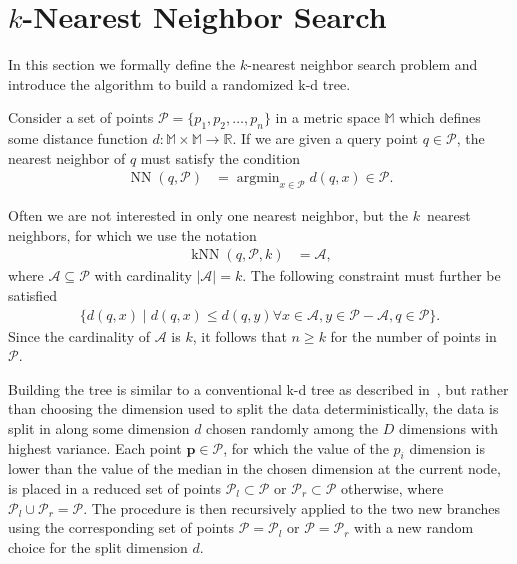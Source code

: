 \section{$k$-Nearest Neighbor Search}
  \label{sec:background}

  In this section we formally define the $k$-nearest neighbor search problem 
  and introduce the algorithm to build a randomized k-d tree.

   Consider a set of points $\mathcal{P} 
  = \{p_1,p_2,\dots,p_n\}$ in a metric space $\mathbb{M}$ which defines some 
  distance function $d\colon\mathbb{M}\times\mathbb{M}\to\mathbb{R}$.  If we 
  are given a query point $q\in\mathcal{P}$, the nearest neighbor of $q$ must 
  satisfy the condition
  \begin{align}
    \label{eq:NN}
    \operatorname{NN}(q,\mathcal{P}) &= \operatorname{argmin}_{x\in\mathcal{P}} 
    d(q,x)\in\mathcal{P}.
  \end{align}

  Often we are not interested in only one nearest neighbor, but the $k$~nearest 
  neighbors, for which we use the notation
  \begin{align}
    \label{eq:kNN}
    \operatorname{kNN}(q,\mathcal{P},k) &= \mathcal{A},
  \end{align}
  where $\mathcal{A}\subseteq\mathcal{P}$ with cardinality 
  $\vert\mathcal{A}\vert = k$.  The following constraint must further be 
  satisfied
  \begin{align}
    \label{eq:constraint_kNN}
    \{d(q,x)\mid d(q,x)\leq d(q,y)\forall x\in\mathcal{A}, 
    y\in\mathcal{P}-\mathcal{A},q\in\mathcal{P}\}.
  \end{align}
  Since the cardinality of $\mathcal{A}$ is $k$, it follows that $n\geq k$ for 
  the number of points in $\mathcal{P}$.

   Building the tree is similar to a conventional 
  k-d tree as described in~\cite{bentley1975a,friedman1977a}, but rather than choosing the dimension used to split the data deterministically, 
  the data is split %
  in along some dimension $d$ chosen randomly among the $D$ dimensions with highest variance. Each point 
  $\pmb{p}\in\mathcal{P}$, for which the value of the $p_i$ dimension is lower than 
  the value of the median in the chosen dimension at the current node, is 
  placed in a reduced set of points $\mathcal{P}_l\subset\mathcal{P}$ or 
  $\mathcal{P}_r\subset\mathcal{P}$ otherwise, where 
  $\mathcal{P}_l\cup\mathcal{P}_r = \mathcal{P}$.
  The procedure is then recursively applied to the two new branches using the 
  corresponding set of points $\mathcal{P}=\mathcal{P}_l$ or 
  $\mathcal{P}=\mathcal{P}_r$ with a new random choice for the split dimension 
  $d$. %
  

